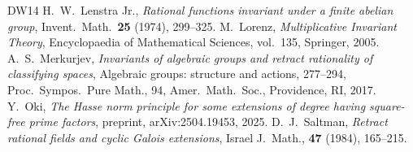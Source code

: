 \documentclass[12pt]{amsart}
\theoremstyle{plain}
\theoremstyle{definition}
\numberwithin{thm}{section}
\numberwithin{equation}{section}
\begin{document}
\begin{thebibliography}{DW14}
H.~W.~Lenstra Jr., \emph{Rational functions invariant under a finite abelian group}, Invent.~Math.~\textbf{25} (1974), 299--325. 
M.~Lorenz, \emph{Multiplicative Invariant Theory}, Encyclopaedia of Mathematical Sciences, vol.~135, Springer, 2005. 
A.~S.~Merkurjev, \emph{Invariants of algebraic groups and retract rationality of classifying spaces}, Algebraic groups: structure and actions, 277--294, Proc.~Sympos.~Pure Math., 94, Amer.~Math.~Soc., Providence, RI, 2017.
Y.~Oki, \emph{The Hasse norm principle for some extensions of degree having square-free prime factors}, preprint, arXiv:2504.19453, 2025. 
D.~J.~Saltman, \emph{Retract rational fields and cyclic Galois extensions}, Israel J.~Math., \textbf{47} (1984), 165--215. 
\end{thebibliography}
\end{document}

